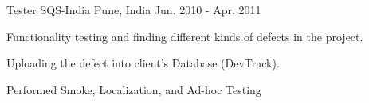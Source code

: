 \begin{cventries}
  \cventry
    {Tester} %
    {SQS-India } %
    {Pune, India} %
    {Jun. 2010 - Apr. 2011} %
    {
      \begin{cvitems} %
        \item {Functionality testing and finding different kinds of defects in the project.}
        \item {Uploading the defect into client’s Database (DevTrack).}
        \item {Performed Smoke, Localization, and Ad-hoc Testing}
      \end{cvitems}
    }

\end{cventries}
